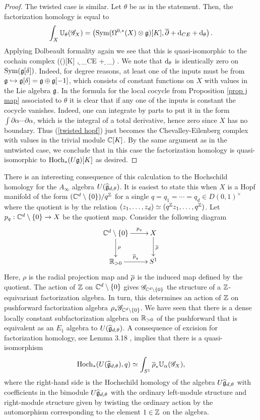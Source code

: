 \documentclass[10pt]{amsart}
\begin{document}
\begin{proof}
The twisted case is similar. 
Let $\theta$ be as in the statement.
Then, the factorization homology is equal to
\[
\int_X \UU_\theta (\sG_X) = \left(\Sym(\Omega^{0,*}(X) \tensor \fg)[K] , \dbar + \d_{CE} + \d_\theta\right) .
\]
Applying Dolbeault formality again we see that this is quasi-isomorphic to the cochain complex
\beqn\label{twisted hopf}
\left(\Sym(\fg[\delta])[K] ,  \d_{CE} + \d_\theta \right) .
\eeqn
We note that $\d_\theta$ is identically zero on $\Sym(\fg[\delta])$. 
Indeed, for degree reasons, at least one of the inputs must be from $\fg \hookrightarrow \fg[\delta] = \fg \oplus \fg[-1]$, which consists of constant functions on $X$ with values in the Lie algebra $\fg$. 
In the formula for the local cocycle from Proposition \ref{prop j map} associated to $\theta$ it is clear that if any one of the inputs is constant the cocycle vanishes. 
Indeed, one can integrate by parts to put it in the form $\int \partial \alpha \cdots \partial \alpha$, which is the integral of a total derivative, hence zero since $X$ has no boundary.
Thus (\ref{twisted hopf}) just becomes the Chevalley-Eilenberg complex with values in the trivial module $\CC[K]$. 
By the same argument as in the untwisted case, we conclude that in this case the factorization homology is quasi-isomorphic to $\Hoch_*(U \fg)[K]$ as desired.
\end{proof}

There is an interesting consequence of this calculation to the Hochschild homology for the $A_\infty$ algebra $U(\Hat{\fg}_{d,\theta})$.
It is easiest to state this when $X$ is a Hopf manifold of the form $(\CC^d \setminus \{0\}) / q^\ZZ$ for a single $q =q_1=\cdots=q_d \in D(0,1)^\times$ where the quotient is by the relation $(z_1,\ldots,z_d) \simeq (q^\ZZ z_1,\ldots,q^\ZZ)$.
Let $p_q :  \CC^d \setminus \{0\} \to X$ be the quotient map.
Consider the following diagram
\[
\xymatrix{
\CC^d \setminus \{0\} \ar[r]^-{p_q} \ar[d]^-{\rho} & X \ar[d]^{\Bar{\rho}} \\
\RR_{>0} \ar[r]^-{\Bar{p}_q} & S^1
}
\]
Here, $\rho$ is the radial projection map and $\Bar{\rho}$ is the induced map defined by the quotient.
The action of $\ZZ$ on $\CC^d \setminus\{0\}$ gives $\sG_{\CC^d \setminus \{0\}}$ the structure of a $\ZZ$-equivariant factorization algebra. 
In turn, this determines an action of $\ZZ$ on pushforward factorization algebra $\rho_* \sG_{\CC^d \setminus \{0\}}$.
We have seen that there is a dense locally constant subfactorization algebra on $\RR_{>0}$ of the pushforward that is equivalent as an $E_1$ algebra to $U(\Hat{\fg}_{d,\theta})$.
A consequence of excision for factorization homology, see Lemma 3.18 \cite{AFTopMan}, implies that there is a quasi-isomorphism
\[
\Hoch_*(U(\Hat{\fg}_{d,\theta}), q) \simeq \int_{S^1} \Bar{\rho}_* \UU_\alpha(\sG_X),
\]
where the right-hand side is the Hochschild homology of the algebra $U \Hat{\fg}_{d,\theta}$ with coefficients in the bimodule $U \Hat{\fg}_{d, \theta}$ with the ordinary left-module structure and right-module structure given by twisting the ordinary action by the automorphism corresponding to the element $1 \in \ZZ$ on the algebra.
\end{document}
